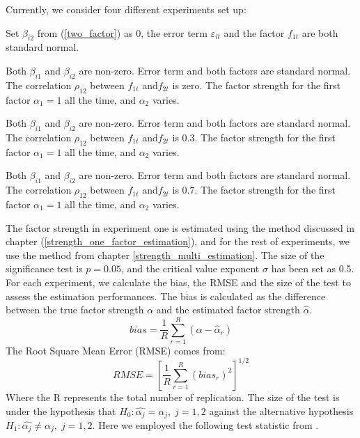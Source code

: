 Currently, we consider four different experiments set up:

\begin{experiment}
Set $\beta_{i2}$ from (\ref{two_factor}) as 0, the error term $\varepsilon_{it}$ and the factor $f_{1t}$ are both standard normal.
\end{experiment}

\begin{experiment}
Both $\beta_{i1}$ and $\beta_{i2}$ are non-zero. Error term and both factors are standard normal. The correlation $\rho_{12}$ between $f_{1t}$ and$f_{2t}$ is zero. 
The factor strength for the first factor $\alpha_1 = 1$ all the time, and $\alpha_2$ varies.
\end{experiment}

\begin{experiment}
Both $\beta_{i1}$ and $\beta_{i2}$ are non-zero. Error term  and both factors are standard normal. The correlation $\rho_{12}$ between $f_{1t}$ and$f_{2t}$ is 0.3.
The factor strength for the first factor $\alpha_1 = 1$ all the time, and $\alpha_2$ varies.
\end{experiment}

\begin{experiment}
	Both $\beta_{i1}$ and $\beta_{i2}$ are non-zero. Error term and both factors are standard normal. The correlation $\rho_{12}$ between $f_{1t}$ and$f_{2t}$ is 0.7.
	The factor strength for the first factor $\alpha_1 = 1$ all the time, and $\alpha_2$ varies.
\end{experiment}

The factor strength in experiment one is estimated using the method discussed in chapter (\ref{strength_one_factor_estimation}), and for the rest of experiments, we use the method from chapter \ref{strength_multi_estimation}.
The size of the significance test is $p = 0.05$, and the critical value exponent $\sigma$ has been set as 0.5.
For each experiment, we calculate the bias, the RMSE and the size of the test to assess the estimation performances.
The bias is calculated as the difference between the true factor strength $\alpha$ and the estimated factor strength $\hat{\alpha}$.
\[bias = \frac{1}{R}\sum_{r = 1}^R(\alpha - \hat{\alpha}_r)\]
The Root Square Mean Error (RMSE) comes from:
\[ RMSE =[\frac{1}{R}\sum_{r=1}^{R}(bias_r)^2 ]^{1/2}\]
Where the R represents the total number of replication.
The size of the test is under the hypothesis that $H_0: \hat{\alpha_j} = \alpha_j,\;j =1, 2$ against the alternative hypothesis $H_1:\hat{\alpha_j} \neq \alpha_j,\; j=1,2$.
Here we employed the following test statistic from .

